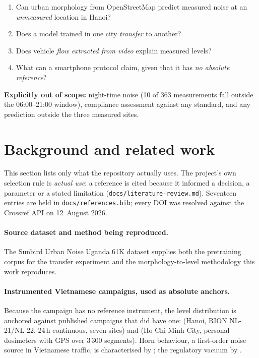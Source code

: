 \documentclass[11pt,a4paper]{article}
\newcommand{\pth}[1]{\texttt{\small #1}}
\begin{document}
\begin{enumerate}[label=\textbf{RQ\arabic*.}, leftmargin=3.2em]
 \item Can urban morphology from OpenStreetMap predict measured noise at an
 \emph{unmeasured} location in Hanoi?
 \item Does a model trained in one city \emph{transfer} to another?
 \item Does vehicle \emph{flow extracted from video} explain measured levels?
 \item What can a smartphone protocol claim, given that it has \emph{no
 absolute reference}?
\end{enumerate}

\noindent\textbf{Explicitly out of scope:} night-time noise (10 of 363
measurements fall outside the 06:00--21:00 window), compliance assessment
against any standard, and any prediction outside the three measured sites.

\section{Background and related work}

This section lists only what the repository actually uses. The project's own
selection rule is \emph{actual use}: a reference is cited because it informed a
decision, a parameter or a stated limitation (\pth{docs/literature-review.md}).
Seventeen entries are held in \pth{docs/references.bib}; every DOI was resolved
against the Crossref API on 12~August 2026.

\paragraph{Source dataset and method being reproduced.}
The Sunbird Urban Noise Uganda 61K dataset \citep{nsumba2026sunbird} supplies both
the pretraining corpus for the transfer experiment and the morphology-to-level
methodology this work reproduces.

\paragraph{Instrumented Vietnamese campaigns, used as absolute anchors.}
Because the campaign has no reference instrument, the level distribution is
anchored against published campaigns that did have one:
\citet{phan2010characteristics} (Hanoi, RION NL-21/NL-22, 24\,h continuous, seven
sites) and \citet{gelb2019cyclists} (Ho Chi Minh City, personal dosimeters with
GPS over 3\,300 segments). Horn behaviour, a first-order noise source in
Vietnamese traffic, is characterised by \citet{nguyen2025horn}; the regulatory
vacuum by \citet{nguyen2025law}.
\end{document}
